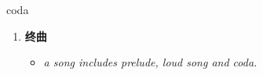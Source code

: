 
\begin{frame}
{\huge coda}
\begin{center}
\begin{enumerate}\Large
  \item \textbf{终曲}
  \begin{itemize}
    \item \em{\Large{a song includes prelude, loud song and coda.}}
  \end{itemize}
\end{enumerate}
\end{center}
\end{frame}
